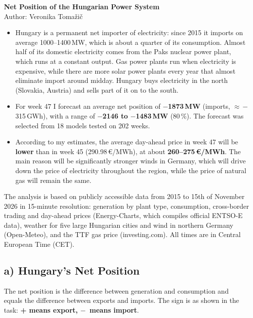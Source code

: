 \documentclass[10pt,a4paper]{article}
\newcommand{\m}{$-$}
\begin{document}
\begin{center}
{\Large\bfseries Net Position of the Hungarian Power System}\\[3pt]
Author: Veronika Tomažič
\end{center}

\begin{itemize}\setlength\itemsep{2pt}
\item[\textbf{a)}] Hungary is a permanent net importer of electricity: since 2015 it imports on average
1000–1400\,MW, which is about a quarter of its consumption. Almost half of its domestic electricity comes from the Paks nuclear
power plant, which runs at a constant output. Gas power plants run when electricity is expensive, while there are more solar power plants every year that almost eliminate import around midday. Hungary buys electricity in the north
(Slovakia, Austria) and sells part of it on to the south.
\item[\textbf{b)}] For week 47 I forecast an average net position of \textbf{\m1873\,MW} (imports, $\approx$\,\m315\,GWh),
with a range of \textbf{\m2146 to \m1483\,MW} (80\,\%). The forecast was selected from 18 models tested on 202 weeks.
\item[\textbf{c)}] According to my estimates, the average day-ahead price in week 47 will be \textbf{lower} than in week 45
(290.98\,€/MWh), at about \textbf{260–275\,€/MWh}. The main reason will be significantly stronger winds in Germany, which will drive down the price of electricity throughout the region, while the price of natural gas will remain the same.
\end{itemize}

The analysis is based on publicly accessible data from 2015 to 15th of November 2026 in 15-minute resolution: generation by plant type,
consumption, cross-border trading and day-ahead prices (Energy-Charts, which compiles official ENTSO-E data),
weather for five large Hungarian cities and wind in northern Germany (Open-Meteo), and the TTF gas price
(investing.com). All times are in Central European Time (CET).

\subsection*{a) Hungary's Net Position}

The net position is the difference between generation and consumption and equals the difference between
exports and imports. The sign is as shown in the task: \textbf{+ means export, \m\ means import}.
\end{document}
